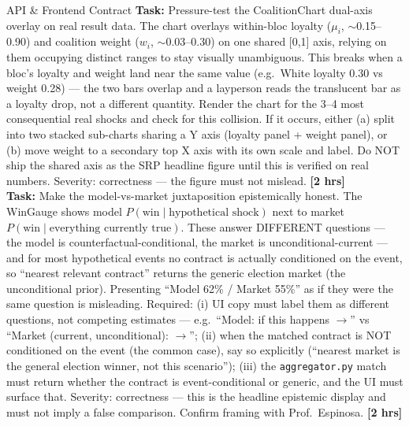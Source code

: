 \documentclass[11pt]{article}
\newcommand{\hrs}[1]{\textbf{[#1 hrs]}}
\newcommand{\task}[2]{%
  \noindent\textbf{Task:} #1 \hfill \hrs{#2}\\}
\begin{document}
\begin{taskbox}{API \& Frontend Contract}
\task{Pressure-test the CoalitionChart dual-axis overlay on real result
  data. The chart overlays within-bloc loyalty ($\mu_i$, $\sim$0.15--0.90)
  and coalition weight ($w_i$, $\sim$0.03--0.30) on one shared [0,1] axis,
  relying on them occupying distinct ranges to stay visually unambiguous.
  This breaks when a bloc's loyalty and weight land near the same value
  (e.g.\ White loyalty 0.30 vs weight 0.28) --- the two bars overlap and a
  layperson reads the translucent bar as a loyalty drop, not a different
  quantity. Render the chart for the 3--4 most consequential real shocks
  and check for this collision. If it occurs, either (a) split into two
  stacked sub-charts sharing a Y axis (loyalty panel + weight panel), or
  (b) move weight to a secondary top X axis with its own scale and label.
  Do NOT ship the shared axis as the SRP headline figure until this is
  verified on real numbers. Severity: correctness --- the figure must not
  mislead.}{2}

\task{Make the model-vs-market juxtaposition epistemically honest. The
  WinGauge shows model $P(\text{win} \mid \text{hypothetical shock})$ next
  to market $P(\text{win} \mid \text{everything currently true})$. These
  answer DIFFERENT questions --- the model is counterfactual-conditional,
  the market is unconditional-current --- and for most hypothetical events
  no contract is actually conditioned on the event, so ``nearest relevant
  contract'' returns the generic election market (the unconditional prior).
  Presenting ``Model 62\% / Market 55\%'' as if they were the same question
  is misleading. Required: (i) UI copy must label them as different
  questions, not competing estimates --- e.g.\ ``Model: if this happens
  $\to$'' vs ``Market (current, unconditional): $\to$''; (ii) when the
  matched contract is NOT conditioned on the event (the common case), say
  so explicitly (``nearest market is the general election winner, not this
  scenario''); (iii) the \texttt{aggregator.py} match must return whether
  the contract is event-conditional or generic, and the UI must surface
  that. Severity: correctness --- this is the headline epistemic display
  and must not imply a false comparison. Confirm framing with
  Prof.\ Espinosa.}{2}

\end{taskbox}
\end{document}
